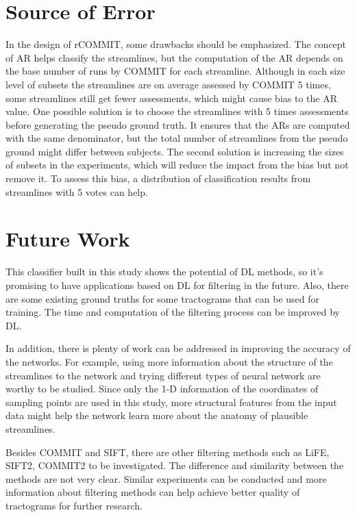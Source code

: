 \section{Source of Error}

In the design of rCOMMIT, some drawbacks should be emphasized. The concept of AR helps classify the streamlines, but the 
computation of the AR depends on the base number of runs by COMMIT for each streamline. 
Although in each size level of subsets the streamlines are on average assessed by COMMIT 5 times, some streamlines still get fewer assessments,
which might cause bias to the AR value. One possible solution is to choose the streamlines with 5 times assessments before
generating the pseudo ground truth. It ensures that the ARs are computed with the same denominator, 
but the total number of streamlines from the pseudo ground might differ between subjects.
The second solution is increasing the sizes of subsets in the experiments, which will reduce the impact from the bias but not remove it.
To assess this bias, a distribution of classification results from streamlines with 5 votes can help.




\section{Future Work}

This classifier built in this study shows the potential of DL methods, so it's promising to have applications 
based on DL for filtering in the future. Also, there are some existing ground truths for some tractograms that 
can be used for training. The time and computation of the filtering process can be improved by DL.   

In addition, there is plenty of work can be addressed in improving the accuracy of the networks.
For example, using more information about the structure of the streamlines to the network
and trying different types of neural network are worthy to be studied. Since only the 1-D information of the 
coordinates of sampling points are used in this study, more structural features from the input data might 
help the network learn more about the anatomy of plausible streamlines.

Besides COMMIT and SIFT, there are other filtering methods such as LiFE, SIFT2, COMMIT2 to be investigated.
The difference and similarity between the methods are not very clear. Similar experiments can be conducted and 
more information about filtering methods can help achieve better quality of tractograms for further research.







